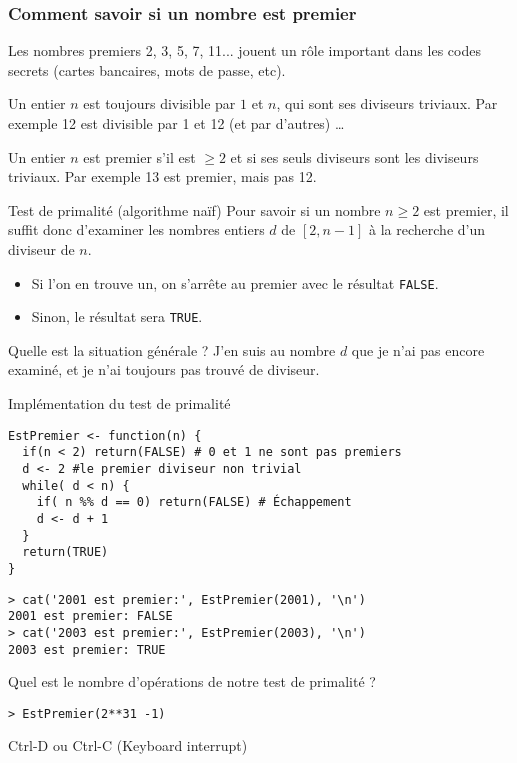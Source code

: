 \documentclass[10pt]{beamer}
\begin{document}
\begin{frame}
  \frametitle{Comment savoir si un nombre est premier}
Les nombres premiers 2, 3, 5, 7, 11... jouent un rôle important dans les codes secrets (cartes bancaires, mots de passe, etc).

Un entier $n$ est toujours divisible par $1$ et $n$, qui sont ses diviseurs triviaux.
Par exemple 12 est divisible par 1 et 12 (et par d'autres) \dots

Un entier $n$ est premier s'il est $\geq 2$ et si ses seuls diviseurs sont les diviseurs triviaux.
Par exemple 13 est premier, mais pas 12.

\begin{block}{Test de primalité (algorithme naïf)}
  Pour savoir si un nombre $n \geq 2$ est premier, il suffit donc d'examiner les nombres entiers $d$ de $[2,n-1]$ à la recherche d'un diviseur de $n$.
  \begin{itemize}
  \item Si l'on en trouve un, on s'arrête au premier avec le résultat \texttt{FALSE}.
  \item Sinon, le résultat sera \texttt{TRUE}.

  \end{itemize}
\end{block}

\begin{block}{Quelle est la situation générale ?}
 J'en suis au nombre $d$ que je n'ai pas encore examiné, et je n'ai toujours pas trouvé de diviseur.
\end{block}
\end{frame}
\begin{frame}[fragile]{Implémentation du test de primalité}
  \begin{lstlisting}[style=editor]
EstPremier <- function(n) {
  if(n < 2) return(FALSE) # 0 et 1 ne sont pas premiers
  d <- 2 #le premier diviseur non trivial
  while( d < n) {
    if( n %% d == 0) return(FALSE) # Échappement
    d <- d + 1
  }
  return(TRUE)
}
\end{lstlisting}

\begin{lstlisting}
> cat('2001 est premier:', EstPremier(2001), '\n')
2001 est premier: FALSE
> cat('2003 est premier:', EstPremier(2003), '\n')
2003 est premier: TRUE
\end{lstlisting}

\begin{alertblock}{Quel est le nombre d'opérations de notre test de primalité ?}
  \begin{lstlisting}[style=edblock]
> EstPremier(2**31 -1)
\end{lstlisting}
Ctrl-D ou Ctrl-C (Keyboard interrupt)
\end{alertblock}
\end{frame}
\end{document}
